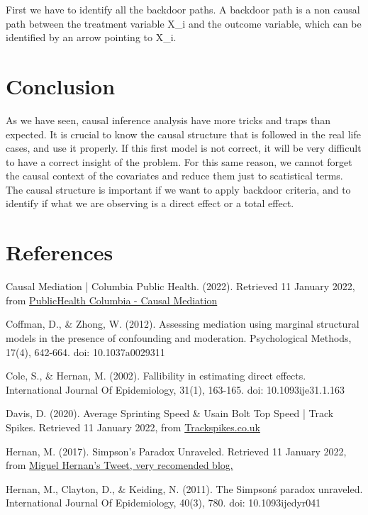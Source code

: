 \documentclass{article}
\begin{document}
First we have to identify all the backdoor paths. A backdoor path is a non causal path between the treatment variable X\_i and the outcome variable, which can be identified by an arrow pointing to X\_i.



\newpage
\section{Conclusion}

As we have seen, causal inference analysis have more tricks and traps than expected. It is crucial to know the causal structure that is followed in the real life cases, and use it properly. If this first model is not correct, it will be very difficult to have a correct insight of the problem. For this same reason, we cannot forget the causal context of the covariates and reduce them just to scatistical terms. The causal structure is important if we want to apply backdoor criteria, and to identify if what we are observing is a direct effect or a total effect. 




\section{References}

Causal Mediation | Columbia Public Health. (2022). Retrieved 11 January 2022, from \href{https://www.publichealth.columbia.edu/research/population-health-methods/causal-mediation}{PublicHealth Columbia - Causal Mediation}

Coffman, D., \& Zhong, W. (2012). Assessing mediation using marginal structural models in the presence of confounding and moderation. Psychological Methods, 17(4), 642-664. doi: 10.1037\/a0029311

Cole, S., \& Hernan, M. (2002). Fallibility in estimating direct effects. International Journal Of Epidemiology, 31(1), 163-165. doi: 10.1093\/ije\/31.1.163

Davis, D. (2020). Average Sprinting Speed \& Usain Bolt Top Speed | Track Spikes. Retrieved 11 January 2022, from \href{https://trackspikes.co.uk/average-sprinting-speed/#}{Trackspikes.co.uk}

Hernan, M. (2017). Simpson's Paradox Unraveled. Retrieved 11 January 2022, from \href{https://twitter.com/_MiguelHernan/status/860542619818106881?s=20}{Miguel Hernan's Tweet, very recomended blog.}

Hernan, M., Clayton, D., \& Keiding, N. (2011). The Simpson\'s paradox unraveled. International Journal Of Epidemiology, 40(3), 780. doi: 10.1093\/ije\/dyr041
\end{document}
